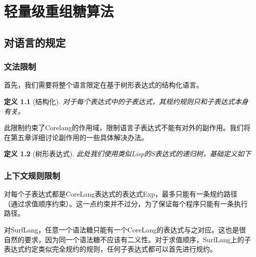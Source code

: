 \pagestyle{fancy}
\normalsize
\linespread{1.5}\selectfont
\label{mark:chapter3}\chapter{轻量级重组糖算法}

\section{对语言的规定}

\subsection{文法限制}
首先，我们需要将整个语言限定在基于树形表达式的结构化语言。

\newtheorem*{Def}{定义}

\label{mark:struct}\begin{Def}[结构化]
	对于每个表达式中的子表达式，其规约规则只和子表达式本身有关。
\end{Def}

此限制约束了Corelang的作用域，限制语言子表达式不能有对外的副作用。我们将在第五章详细讨论副作用的一些具体解决办法。

\begin{Def}[树形表达式]
	此处我们使用类似Lisp的S表达式的递归树，基础定义如下
\end{Def}
\begin{center}
\end{center}

\subsection{上下文规则限制}


对每个子表达式都是CoreLang表达式的表达式Exp，最多只能有一条规约路径（通过求值顺序约束）。这一点约束并不过分，为了保证每个程序只能有一条执行路径。

对SurfLang，任意一个语法糖只能有一个CoreLang的表达式与之对应。这也是很自然的要求，因为同一个语法糖不应该有二义性。对于求值顺序，SurfLang上的子表达式约定类似完全规约的规则，任何子表达式都可以首先进行规约。

